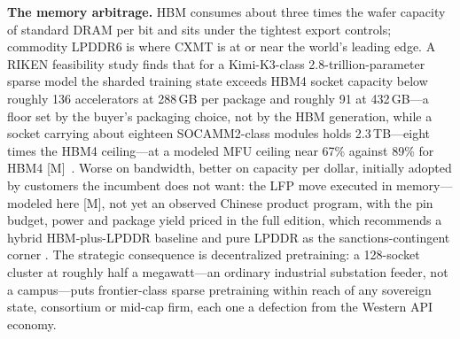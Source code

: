 \textbf{The memory arbitrage.} HBM consumes about three times the wafer capacity of standard DRAM per bit and sits under the tightest export controls; commodity LPDDR6 is where CXMT is at or near the world's leading edge. A RIKEN feasibility study finds that for a Kimi-K3-class 2.8-trillion-parameter sparse model the sharded training state exceeds HBM4 socket capacity below roughly 136 accelerators at 288\,GB per package and roughly 91 at 432\,GB---a floor set by the buyer's packaging choice, not by the HBM generation, while a socket carrying about eighteen SOCAMM2-class modules holds 2.3\,TB---eight times the HBM4 ceiling---at a modeled MFU ceiling near 67\% against 89\% for HBM4 [M]~\cite{riken-study}. Worse on bandwidth, better on capacity per dollar, initially adopted by customers the incumbent does not want: the LFP move executed in memory---modeled here [M], not yet an observed Chinese product program, with the pin budget, power and package yield priced in the full edition, which recommends a hybrid HBM-plus-LPDDR baseline and pure LPDDR as the sanctions-contingent corner . The strategic consequence is decentralized pretraining: a 128-socket cluster at roughly half a megawatt---an ordinary industrial substation feeder, not a campus---puts frontier-class sparse pretraining within reach of any sovereign state, consortium or mid-cap firm, each one a defection from the Western API economy.

